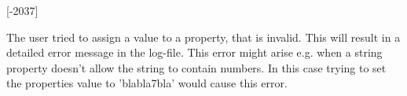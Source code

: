 \begin{Desc}
\begin{description}
{\bfseries }\mbox{[}-\/2037\mbox{]} \item[{\em 
\hypertarget{group___common_interface_gga61b0634ab285d9a2a303e0092167127ea6298ae160d7c53d9a34ce6153d637258}{P\+R\+O\+P\+H\+A\+N\+D\+L\+I\+N\+G\+\_\+\+P\+R\+O\+P\+\_\+\+V\+A\+L\+I\+D\+A\+T\+I\+O\+N\+\_\+\+F\+A\+I\+L\+E\+D}\label{group___common_interface_gga61b0634ab285d9a2a303e0092167127ea6298ae160d7c53d9a34ce6153d637258}
}]The user tried to assign a value to a property, that is invalid. This will result in a detailed error message in the log-\/file. This error might arise e.\+g. when a string property doesn't allow the string to contain numbers. In this case trying to set the properties value to 'blabla7bla' would cause this error.


\end{description}
\end{Desc}
